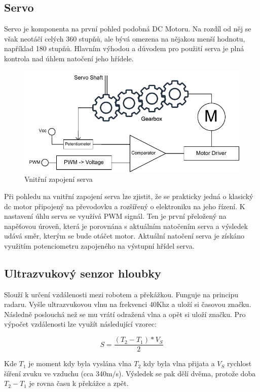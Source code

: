 \subsection*{Servo}
Servo je komponenta na první pohled podobná DC Motoru. Na rozdíl od něj se však neotáčí celých 360 stupňů, ale bývá omezena na nějakou menší hodnotu, například 180 stupňů. Hlavním výhodou a důvodem pro použití serva je plná kontrola nad úhlem natočení jeho hřídele. \cite{embeded_robotics}

\begin{figure}[h!]
	\centering
	\includegraphics[scale=0.9]{obrazky-figures/servo.pdf}
	\caption{Vnitřní zapojení serva}
	\label{}
\end{figure}

Při pohledu na vnitřní zapojení serva lze zjistit, že se prakticky jedná o klasický dc motor připojený na převodovku a rozšířený o elektroniku na jeho řízení. K nastavení úhlu serva se využívá PWM signál. Ten je první přeložený na napěťovou úroveň, která je porovnána s aktuálním natočením serva a výsledek udává směr, kterým se bude otáčet motor. Aktuální natočení serva je získáno využitím potenciometru zapojeného na výstupní hřídel serva. \cite{embeded_robotics}

\subsection*{Ultrazvukový senzor hloubky}
Slouží k určení vzdálenosti mezi robotem a překážkou. Funguje na principu radaru. Vyšle ultrazvukovou vlnu na frekvenci 40Khz a uloží si časovou značku. Následně poslouchá než se mu vrátí odražená vlna a opět si uloží značku.
Pro výpočet vzdálenosti lze využít následující vzorec:

$$S = \frac{(T_2 - T_1) * V_S}{2}$$

Kde $T_1$ je moment kdy byla vyslána vlna $T_2$ kdy byla vlna přijata a $V_S$ rychlost šíření zvuku ve vzduchu (cca 340m/s). Výsledek se pak dělí dvěma, protože doba $T_2 - T_1$ je rovna času k překážce a zpět.

